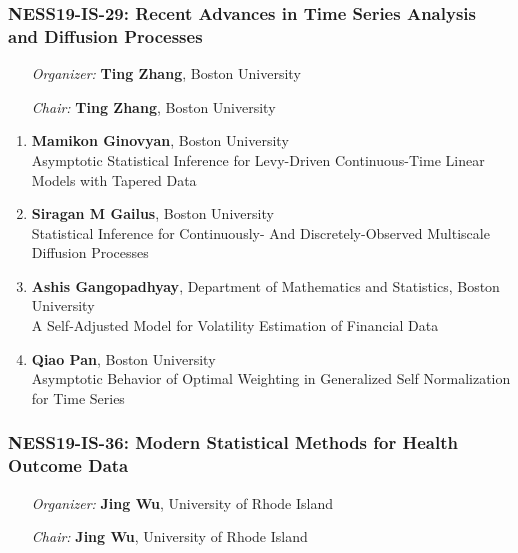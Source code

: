 \subsubsection*{NESS19-IS-29: Recent Advances in Time Series Analysis and Diffusion Processes}

\begin{enumerate}[align=left]
\item [\emph{Organizer:}] \textbf{Ting Zhang}, Boston University
\item [\emph{Chair:}] \textbf{Ting Zhang}, Boston University
\end{enumerate}

\begin{enumerate}
\item \textbf{Mamikon Ginovyan}, Boston University \\
Asymptotic Statistical Inference for Levy-Driven Continuous-Time Linear Models with Tapered Data
\item \textbf{Siragan M Gailus}, Boston University \\
Statistical Inference for Continuously- And Discretely-Observed Multiscale Diffusion Processes
\item \textbf{Ashis Gangopadhyay}, Department of Mathematics and Statistics, Boston University \\
A Self-Adjusted Model for Volatility Estimation of Financial Data
\item \textbf{Qiao Pan}, Boston University \\
Asymptotic Behavior of Optimal Weighting in Generalized Self Normalization for Time Series
\end{enumerate}

\subsubsection*{NESS19-IS-36: Modern Statistical Methods for Health Outcome Data}

\begin{enumerate}[align=left]
\item [\emph{Organizer:}] \textbf{Jing Wu}, University of Rhode Island
\item [\emph{Chair:}] \textbf{Jing Wu}, University of Rhode Island
\end{enumerate}

